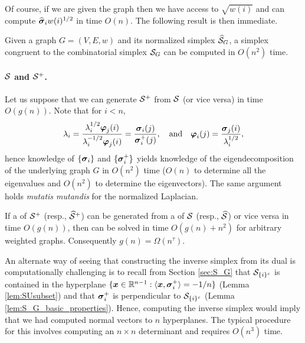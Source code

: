 Of course, if we are given the graph then we have access to $\sqrt{w(i)}$ and can compute $\widehat{\vb*{\sigma}}_i w(i)^{1/2}$ in time $O(n)$. The following result is then immediate. 

\begin{lemma}
	Given a graph $G=(V,E,w)$ and its normalized simplex $\widehat{\mathcal{S}}_G$, a simplex congruent to  the combinatorial simplex $\mathcal{S}_G$ can be computed in $O(n^2)$ time. 
\end{lemma}




\paragraph{\texorpdfstring{$\mathcal{S}$}{The combinatorial} and \texorpdfstring{$\mathcal{S}^+$}{normalized simplex}.}

Let us suppose that we can generate $\mathcal{S}^+$ from $\mathcal{S}$ (or vice versa) in time $O(g(n))$. Note that for $i<n$, 
\begin{equation}
\label{eq:decomp_from_vertices}
\lambda_i = \frac{\lambda_i^{1/2} \vb*{\varphi}_j(i)}{\lambda_i^{-1/2}\vb*{\varphi}_j(i)} = \frac{\vb*{\sigma}_i(j)}{\vb*{\sigma}_i^+(j)}, \quad \text{and} \quad \vb*{\varphi}_i(j) = \frac{\vb*{\sigma}_j(i)}{\lambda_i^{1/2}},
\end{equation}
hence knowledge of $\{\vb*{\sigma}_i\}$ and $\{\vb*{\sigma}_i^+\}$ yields knowledge of the eigendecomposition of the underlying graph $G$ in $O(n^2)$ time ($O(n)$ to determine all the  eigenvalues and $O(n^2)$ to determine the eigenvectors). The same argument holds \emph{mutatis mutandis} for the normalized Laplacian. 

\begin{lemma}
	\label{lem:S_to_S^+_vdesc}
	If a \vdesc of $\mathcal{S}^+$  (resp., $\widehat{\mathcal{S}}^+$) can be generated from a \vdesc of $\mathcal{S}$ (resp., $\widehat{\mathcal{S}}$) or vice versa in time $O(g(n))$, then \lapdecomp can be solved in time $O(g(n) + n^2)$ for arbitrary weighted graphs. Consequently $g(n) = \Omega(n^\tau)$.  
\end{lemma}

An alternate way of seeing that constructing the inverse simplex from its dual is computationally challenging is to recall from Section \ref{sec:S_G} that $\mathcal{S}_{\{i\}^c}$ is contained in the hyperplane $\{\vb*{x}\in\mathbb{R}^{n-1}:\langle \vb*{x},\vb*{\sigma}_i^+\rangle = -1/n\}$ (Lemma \ref{lem:SUsubset})
 and that $\vb*{\sigma}_i^+$ is perpendicular to $\mathcal{S}_{\{i\}^c}$ (Lemma \ref{lem:S_G_basic_properties}). Hence, computing the inverse simplex would imply that we had computed normal vectors to $n$ hyperplanes. The typical procedure for this involves computing an $n\times n$ determinant and requires  $O(n^3)$ time. 
 
